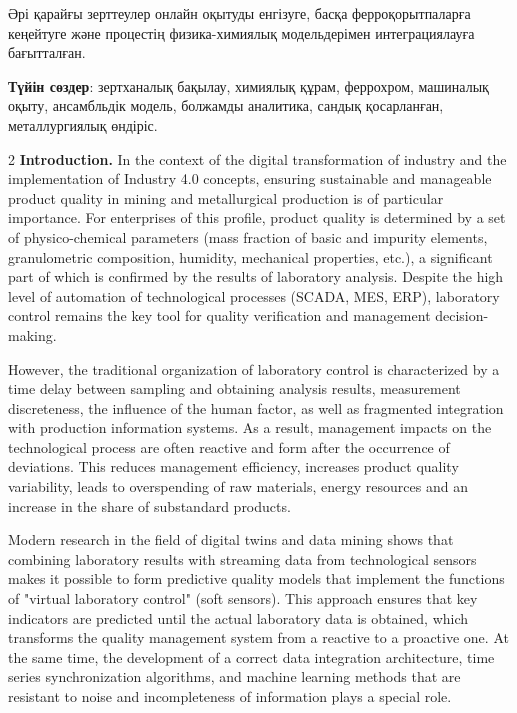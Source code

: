 Әрі қарайғы зерттеулер онлайн оқытуды енгізуге, басқа ферроқорытпаларға
кеңейтуге және процестің физика-химиялық модельдерімен интеграциялауға
бағытталған.

{\bfseries Түйін сөздер}: зертханалық бақылау, химиялық құрам, феррохром,
машиналық оқыту, ансамбльдік модель, болжамды аналитика, сандық
қосарланған, металлургиялық өндіріс.

\begin{multicols}{2}
{\bfseries Introduction.} In the context of the digital transformation of
industry and the implementation of Industry 4.0 concepts, ensuring
sustainable and manageable product quality in mining and metallurgical
production is of particular importance. For enterprises of this profile,
product quality is determined by a set of physico-chemical parameters
(mass fraction of basic and impurity elements, granulometric
composition, humidity, mechanical properties, etc.), a significant part
of which is confirmed by the results of laboratory analysis. Despite the
high level of automation of technological processes (SCADA, MES, ERP),
laboratory control remains the key tool for quality verification and
management decision-making.

However, the traditional organization of laboratory control is
characterized by a time delay between sampling and obtaining analysis
results, measurement discreteness, the influence of the human factor, as
well as fragmented integration with production information systems. As a
result, management impacts on the technological process are often
reactive and form after the occurrence of deviations. This reduces
management efficiency, increases product quality variability, leads to
overspending of raw materials, energy resources and an increase in the
share of substandard products.

Modern research in the field of digital twins and data mining shows that
combining laboratory results with streaming data from technological
sensors makes it possible to form predictive quality models that
implement the functions of "virtual laboratory control" (soft sensors).
This approach ensures that key indicators are predicted until the actual
laboratory data is obtained, which transforms the quality management
system from a reactive to a proactive one. At the same time, the
development of a correct data integration architecture, time series
synchronization algorithms, and machine learning methods that are
resistant to noise and incompleteness of information plays a special
role.


\end{multicols}
